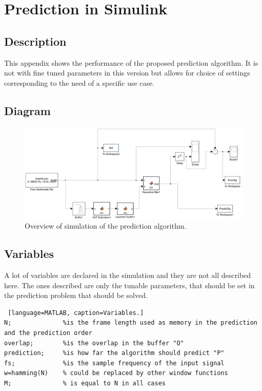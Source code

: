 
\section{Prediction in Simulink} \label{sec:predicSimulink}


\subsection{Description}
This appendix shows the performance of the proposed prediction algorithm. It is not with fine tuned parameters in this version but allows for choice of settings corresponding to the need of a specific use case.  


\subsection{Diagram}
\begin{figure} [h]
	\centering
	\includegraphics[width=\textwidth]{../Journal/Code/SimulinkPrediction}
	\caption{Overview of simulation of the prediction algorithm.}
	\label{Fig:PredictionSimulink}
\end{figure}


\subsection{Variables}
A lot of variables are declared in the simulation and they are not all described here. The ones described are only the tunable parameters, that should be set in the prediction problem that should be solved. 
\begin{lstlisting} [language=MATLAB, caption=Variables.]
N; 				%is the frame length used as memory in the prediction and the prediction order
overlap;		%is the overlap in the buffer "O"
prediction; 	%is how far the algorithm should predict "P"
fs; 			%is the sample frequency of the input signal 
w=hamming(N)	% could be replaced by other window functions
M;				% is equal to N in all cases
\end{lstlisting}

